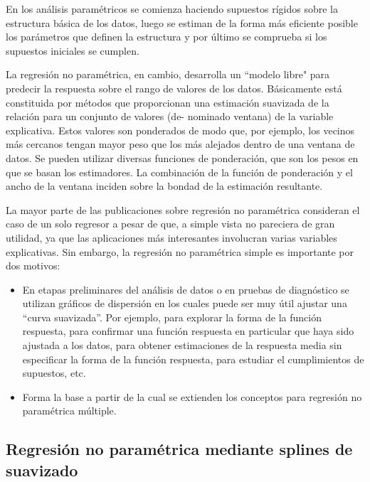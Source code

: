 \documentclass[
  12pt,
]{krantz}
\providecommand{\tightlist}{%
  \setlength{\itemsep}{0pt}\setlength{\parskip}{0pt}}
\begin{document}
En los análisis paramétricos se comienza haciendo supuestos rígidos sobre la estructura básica de los datos, luego se estiman de la forma más eficiente posible los parámetros que definen la estructura y por último se comprueba si los supuestos iniciales se cumplen.

La regresión no paramétrica, en cambio, desarrolla un ``modelo libre" \hspace{0.02cm} para predecir la respuesta sobre el rango de valores de los datos. Básicamente está constituida por métodos que proporcionan una estimación suavizada de la relación para un conjunto de valores (de- nominado ventana) de la variable explicativa. Estos valores son ponderados de modo que, por ejemplo, los vecinos más cercanos tengan mayor peso que los más alejados dentro de una ventana de datos. Se pueden utilizar diversas funciones de ponderación, que son los pesos en que se basan los estimadores. La combinación de la función de ponderación y el ancho de la ventana inciden sobre la bondad de la estimación resultante.

La mayor parte de las publicaciones sobre regresión no paramétrica consideran el caso de un solo regresor a pesar de que, a simple vista no pareciera de gran utilidad, ya que las aplicaciones más interesantes involucran varias variables explicativas. Sin embargo, la regresión no paramétrica simple es importante por dos motivos:

\begin{itemize}
\tightlist
\item
  En etapas preliminares del análisis de datos o en pruebas de diagnóstico se utilizan gráficos de dispersión en los cuales puede ser muy útil ajustar una ``curva suavizada''. Por ejemplo, para explorar la forma de la función respuesta, para confirmar una función respuesta en particular que haya sido ajustada a los datos, para obtener estimaciones de la respuesta media sin especificar la forma de la función respuesta, para estudiar el cumplimientos de supuestos, etc.
\item
  Forma la base a partir de la cual se extienden los conceptos para regresión no paramétrica múltiple.
\end{itemize}

\hypertarget{regresion-no-parametrica-mediante-splines-de-suavizado}{%
\subsection{Regresión no paramétrica mediante splines de suavizado}\label{regresion-no-parametrica-mediante-splines-de-suavizado}}
\end{document}

